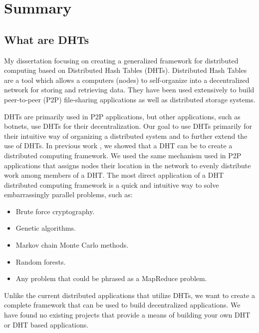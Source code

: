\documentclass[12pt,a4paper]{article}
\begin{document}
\newpage





\section{Summary}
\subsection*{What are DHTs}
My dissertation focusing on creating a generalized framework for distributed computing based on Distributed Hash Tables (DHTs).
Distributed Hash Tables are a tool which allows a computers (nodes) to self-organize into a decentralized network for storing and retrieving data.
They have been used extensively to build peer-to-peer (P2P) file-sharing applications as well as distributed storage systems.

DHTs are primarily used in P2P applications, but other applications, such as botnets, use DHTs for their decentralization.
Our goal to use DHTs primarily for their intuitive way of organizing a distributed system and to further extend the use of DHTs.
In previous work \cite{chordreduce}, we showed  that a DHT can be to create a distributed computing framework.
We used the same mechanism used in P2P applications that assigns nodes their location in the network to evenly distribute work among members of a DHT.
The most direct application of a DHT distributed computing framework is  a quick and intuitive way to solve embarrassingly parallel problems, such as:
\begin{itemize}
	\item Brute force cryptography.
	\item Genetic algorithms.
	\item Markov chain Monte Carlo methods.
	\item Random forests.
	\item Any problem that could be phrased as a MapReduce problem.
	
\end{itemize}
Unlike the current distributed applications that utilize DHTs, we want to create a complete framework that can be used to build decentralized applications.
We have found no existing projects that provide a means of building your own DHT or DHT based applications. %
\end{document}
